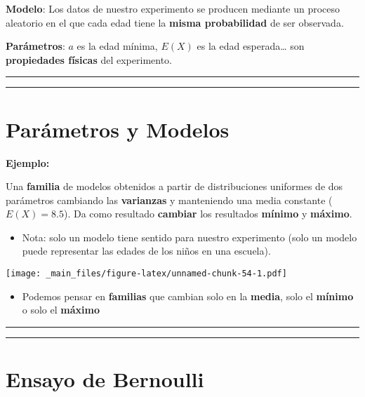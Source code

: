 \documentclass[
]{book}
\providecommand{\tightlist}{%
  \setlength{\itemsep}{0pt}\setlength{\parskip}{0pt}}
\begin{document}
\textbf{Modelo}: Los datos de nuestro experimento se producen mediante un proceso aleatorio en el que cada edad tiene la \textbf{misma probabilidad} de ser observada.

\textbf{Parámetros}: \(a\) es la edad mínima, \(E(X)\) es la edad esperada\ldots{} son \textbf{propiedades físicas} del experimento.

\begin{center}\rule{0.5\linewidth}{0.5pt}\end{center}

\begin{center}\rule{0.5\linewidth}{0.5pt}\end{center}

\hypertarget{paruxe1metros-y-modelos-1}{%
\section{Parámetros y Modelos}\label{paruxe1metros-y-modelos-1}}

\textbf{Ejemplo:}

Una \textbf{familia} de modelos obtenidos a partir de distribuciones uniformes de dos parámetros cambiando las \textbf{varianzas} y manteniendo una media constante (\(E(X)=8.5\)). Da como resultado \textbf{cambiar} los resultados \textbf{mínimo} y \textbf{máximo}.

\begin{itemize}
\tightlist
\item
  Nota: solo un modelo tiene sentido para nuestro experimento (solo un modelo puede representar las edades de los niños en una escuela).
\end{itemize}

\texttt{[image: \_main\_files/figure-latex/unnamed-chunk-54-1.pdf]}

\begin{itemize}
\tightlist
\item
  Podemos pensar en \textbf{familias} que cambian solo en la \textbf{media}, solo el \textbf{mínimo} o solo el \textbf{máximo}
\end{itemize}

\begin{center}\rule{0.5\linewidth}{0.5pt}\end{center}

\begin{center}\rule{0.5\linewidth}{0.5pt}\end{center}

\hypertarget{ensayo-de-bernoulli}{%
\section{Ensayo de Bernoulli}\label{ensayo-de-bernoulli}}
\end{document}
